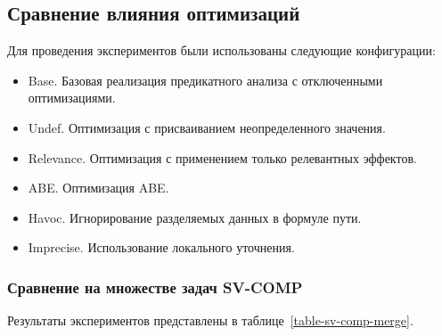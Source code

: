 \subsection{Сравнение влияния оптимизаций}

Для проведения экспериментов были использованы следующие конфигурации:

\begin{itemize}
\item Base. Базовая реализация предикатного анализа с отключенными оптимизациями.
\item Undef. Оптимизация с присваиванием неопределенного значения.
\item Relevance. Оптимизация с применением только релевантных эффектов.
\item ABE. Оптимизация ABE.
\item Havoc. Игнорирование разделяемых данных в формуле пути.
\item Imprecise. Использование локального уточнения.
\end{itemize}

\subsubsection{Сравнение на множестве задач SV-COMP}

Результаты экспериментов представлены в таблице~\ref{table-sv-comp-merge}.

